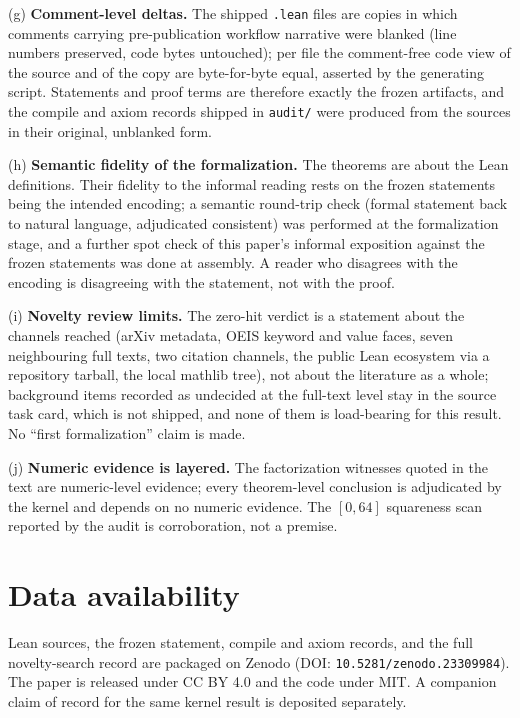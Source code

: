 \documentclass[11pt]{article}
\theoremstyle{definition}
\begin{document}
(g) \textbf{Comment-level deltas.} The shipped \texttt{.lean} files are copies
in which comments carrying pre-publication workflow narrative were blanked
(line numbers preserved, code bytes untouched); per file the comment-free code
view of the source and of the copy are byte-for-byte equal, asserted by the
generating script. Statements and proof terms are therefore exactly the frozen
artifacts, and the compile and axiom records shipped in \texttt{audit/} were
produced from the sources in their original, unblanked form.

(h) \textbf{Semantic fidelity of the formalization.} The theorems are about
the Lean definitions. Their fidelity to the informal reading rests on the
frozen statements being the intended encoding; a semantic round-trip check
(formal statement back to natural language, adjudicated consistent) was
performed at the formalization stage, and a further spot check of this paper's
informal exposition against the frozen statements was done at assembly. A
reader who disagrees with the encoding is disagreeing with the statement, not
with the proof.

(i) \textbf{Novelty review limits.} The zero-hit verdict is a statement about
the channels reached (arXiv metadata, OEIS keyword and value faces, seven
neighbouring full texts, two citation channels, the public Lean ecosystem via a
repository tarball, the local mathlib tree), not about the literature as a
whole; background items recorded as undecided at the full-text level stay in
the source task card, which is not shipped, and none of them is load-bearing
for this result. No ``first formalization'' claim is made.

(j) \textbf{Numeric evidence is layered.} The factorization witnesses quoted
in the text are numeric-level evidence; every theorem-level conclusion is
adjudicated by the kernel and depends on no numeric evidence. The
$[0,64]$ squareness scan reported by the audit is corroboration, not a
premise.

\section*{Data availability}
Lean sources, the frozen statement, compile and axiom records, and the full
novelty-search record are packaged on Zenodo (DOI: \texttt{10.5281/zenodo.23309984}).
The paper is released under CC BY 4.0 and the code under MIT. A companion
claim of record for the same kernel result is deposited separately.

\end{document}
